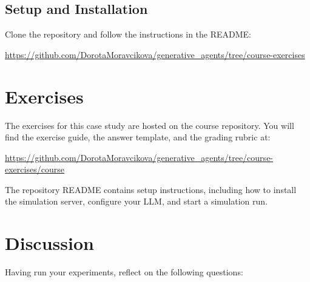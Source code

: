 \subsection{Setup and Installation}

Clone the repository and follow the instructions in the README:

\url{https://github.com/DorotaMoravcikova/generative_agents/tree/course-exercises}

\section{Exercises}

The exercises for this case study are hosted on the course repository. You will find the exercise guide, the answer template, and the grading rubric at:

\begin{center}
\url{https://github.com/DorotaMoravcikova/generative_agents/tree/course-exercises/course}
\end{center}

\noindent The repository README contains setup instructions, including how to install the simulation server, configure your LLM, and start a simulation run.

\section{Discussion}

Having run your experiments, reflect on the following questions:

